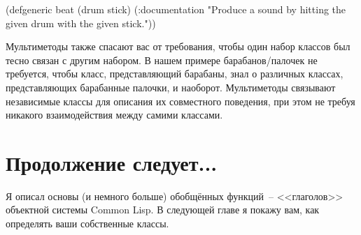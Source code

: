 \begin{myverb}
(defgeneric beat (drum stick)
  (:documentation
   "Produce a sound by hitting the given drum with the given stick."))
\end{myverb}


Мультиметоды также спасают вас от требования, чтобы один набор классов был тесно связан с
другим набором. В нашем примере барабанов/палочек не требуется, чтобы класс,
представляющий барабаны, знал о различных классах, представляющих барабанные палочки, и
наоборот.  Мультиметоды связывают независимые классы для описания их совместного
поведения, при этом не требуя никакого взаимодействия между самими классами.

\section{Продолжение следует...}

Я описал основы (и немного больше) обобщённых функций~-- <<глаголов>> объектной системы
Common Lisp.  В следующей главе я покажу вам, как определять ваши собственные классы.

